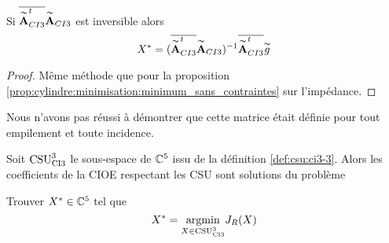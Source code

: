     \begin{prop}
      Si \(\conj{\tilde{\mA}_{CI3}^t}\tilde{\mA}_{CI3}\) est inversible alors
      \begin{equation*}
        X^* = (\conj{\tilde{\mA}_{CI3}^t}\tilde{\mA}_{CI3})^{-1}\conj{\tilde{\mA}_{CI3}^t}\tilde{g}
      \end{equation*}
    \end{prop}
    \begin{proof}
      Même méthode que pour la proposition \ref{prop:cylindre:minimisation:minimum_sans_contraintes} sur l'impédance.
    \end{proof}

    Nous n'avons pas réussi à démontrer que cette matrice était définie pour tout empilement et toute incidence.

    \begin{thm}

      Soit \(\CSU[3]{CI3}\) le sous-espace de \(\CC^5\) issu de la définition \ref{def:csu:ci3-3}.
      Alors les coefficients de la CIOE respectant les CSU sont solutions du problème

      Trouver \(X^* \in \CC^5\) tel que
      \begin{equation*}
        X^* = \argmin{X\in \CSU[3]{CI3}} J_R(X)
      \end{equation*}
    \end{thm}

